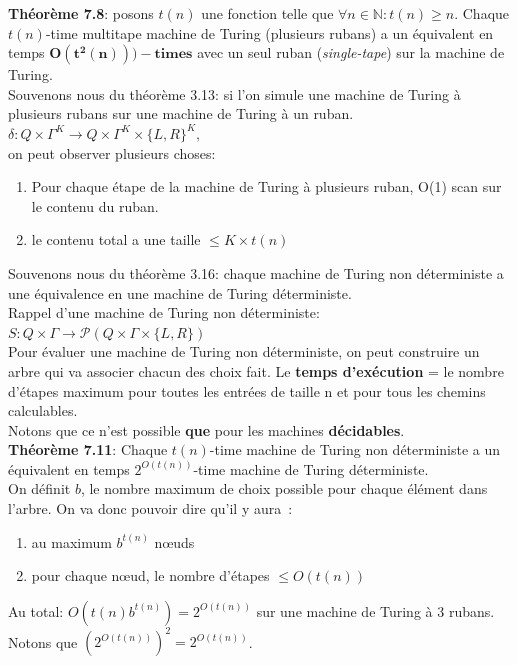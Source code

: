 \documentclass[a4paper,12pt]{article}
\begin{document}
  \textbf{Théorème 7.8}: posons $t(n)$ une fonction telle que $\forall n \in \mathbb N : t(n) \geq n$.
	Chaque $t(n)$-time multitape machine de Turing (plusieurs rubans) a un équivalent en temps $\mathbf{O(t^2(n)))-times}$ avec un seul ruban (\textit{single-tape}) sur la machine de Turing.\\
  Souvenons nous du théorème 3.13: si l'on simule une machine de Turing à plusieurs rubans sur une machine de Turing à un ruban.
	$\delta : Q \times \Gamma^K \rightarrow Q \times \Gamma^K \times \{L, R\}^K,$\\
  on peut observer plusieurs choses:
  \begin{enumerate}
   \item Pour chaque étape de la machine de Turing à plusieurs ruban, O(1) scan sur le contenu du ruban.
   \item le contenu total a une taille $\leq K \times t(n)$
  \end{enumerate}

  Souvenons nous du théorème 3.16: chaque machine de Turing non déterministe a une équivalence en une machine de Turing déterministe.\\
  Rappel d'une machine de Turing non déterministe: $S:Q \times \Gamma \rightarrow \mathcal P(Q \times \Gamma \times \{L, R\})$\\
  Pour évaluer une machine de Turing non déterministe, on peut construire un arbre qui va associer chacun des choix fait. Le \textbf{temps d'exécution} = le nombre d'étapes maximum pour toutes les entrées de taille n et pour tous les chemins calculables.\\
  Notons que ce n'est possible \textbf{que} pour les machines \textbf{décidables}.\\
  \textbf{Théorème 7.11}: Chaque $t(n)$-time machine de Turing non déterministe a un équivalent en temps $2^{O(t(n))}$-time machine de Turing déterministe.\\
  On définit $b$, le nombre maximum de choix possible pour chaque élément dans l'arbre. On va donc pouvoir dire qu'il y aura~:
  \begin{enumerate}
   \item au maximum $b^{t(n)}$ nœuds
   \item pour chaque nœud, le nombre d'étapes $\leq O(t(n))$
  \end{enumerate}
  Au total: $O(t(n) b^{t(n)}) = 2^{O(t(n))}$ sur une machine de Turing à 3 rubans.\\
  Notons que $(2^{O(t(n))})^2 = 2^{O(t(n))}$.\\
\end{document}
